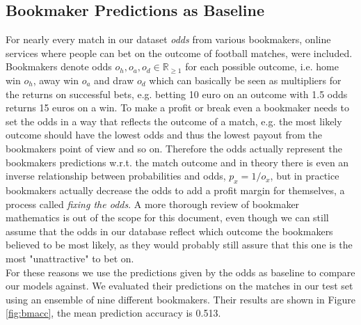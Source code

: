 \documentclass[a4paper]{article}
\begin{document}
\subsection{Bookmaker Predictions as Baseline}
For nearly every match in our dataset \textit{odds} from various bookmakers,
online services where people can bet on the outcome of football matches, were
included. Bookmakers denote odds $o_h, o_a, o_d \in \mathbb{R}_{\geq 1}$ for
each possible outcome, i.e. home win $o_h$, away win $o_a$ and draw $o_d$ which
can basically be seen as multipliers for the returns on successful bets, e.g.
betting 10 euro on an outcome with 1.5 odds returns 15 euros on a win. To make a
profit or break even a bookmaker needs to set the odds in a way that reflects
the outcome of a match, e.g. the most likely outcome should have the lowest odds
and thus the lowest payout from the bookmakers point of view and so on.
Therefore the odds actually represent the bookmakers predictions w.r.t. the
match outcome and in theory there is even an inverse relationship between
probabilities and odds, $p_x = 1/o_x$, but in practice bookmakers actually
decrease the odds to add a profit margin for themselves, a process called
\textit{fixing the odds}. A more thorough review of bookmaker mathematics is out
of the scope for this document, even though we can still assume that the odds in
our database reflect which outcome the bookmakers believed to be most likely, as
they would probably still assure that this one is the most "unattractive" to bet
on. \\
For these reasons we use the predictions given by the odds as baseline to
compare our models against. We evaluated their predictions on the matches in our
test set using an ensemble of nine different bookmakers. Their results are shown
in Figure \ref{fig:bmacc}, the mean prediction accuracy is 0.513.
\end{document}
